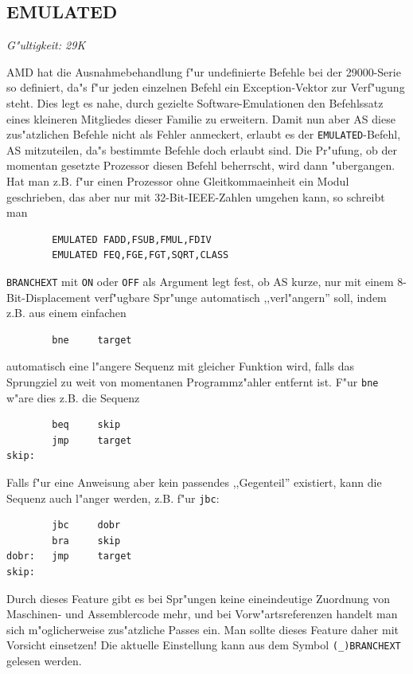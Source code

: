 \documentclass[12pt,a4paper,twoside]{report}
\makeatletter
\newcommand{\tty}[1]{{\tt #1}}
\newcommand{\ttindex}[1]{\index{#1@{\tt #1}}}
\newcommand{\asname}{AS}
\newcommand{\predefsym}[1]{{\tt (\_)#1}}
\makeatother
\begin{document}

\subsection{EMULATED}
\ttindex{EMULATED}

{\em G"ultigkeit: 29K}

AMD hat die Ausnahmebehandlung f"ur undefinierte Befehle bei der
29000-Serie so definiert, da"s f"ur jeden einzelnen Befehl ein
Exception-Vektor zur Verf"ugung steht.  Dies legt es nahe, durch
gezielte Software-Emulationen den Befehlssatz eines kleineren
Mitgliedes dieser Familie zu erweitern.  Damit nun aber \asname{} diese
zus"atzlichen Befehle nicht als Fehler anmeckert, erlaubt es der
\tty{EMULATED}-Befehl, \asname{} mitzuteilen, da"s bestimmte Befehle doch
erlaubt sind.  Die Pr"ufung, ob der momentan gesetzte Prozessor
diesen Befehl beherrscht, wird dann "ubergangen.  Hat man z.B. f"ur
einen Prozessor ohne Gleitkommaeinheit ein Modul geschrieben, das
aber nur mit 32-Bit-IEEE-Zahlen umgehen kann, so schreibt man
\begin{verbatim}
        EMULATED FADD,FSUB,FMUL,FDIV
        EMULATED FEQ,FGE,FGT,SQRT,CLASS
\end{verbatim}

{\tt BRANCHEXT} mit \tty{ON} oder \tty{OFF} als Argument legt fest, ob \asname{}
kurze, nur mit einem 8-Bit-Displacement verf"ugbare Spr"unge automatisch
,,verl"angern'' soll, indem z.B. aus einem einfachen
\begin{verbatim}
        bne     target
\end{verbatim}
automatisch eine l"angere Sequenz mit gleicher Funktion wird, falls das
Sprungziel zu weit von momentanen Programmz"ahler entfernt ist.  F"ur
{\tt bne} w"are dies z.B. die Sequenz
\begin{verbatim}
        beq     skip
        jmp     target
skip:
\end{verbatim}
Falls f"ur eine Anweisung aber kein passendes ,,Gegenteil'' existiert,
kann die Sequenz auch l"anger werden, z.B. f"ur {\tt jbc}:
\begin{verbatim}
        jbc     dobr
        bra     skip
dobr:   jmp     target
skip:
\end{verbatim}
Durch dieses Feature gibt es bei Spr"ungen keine eineindeutige Zuordnung
von Maschinen- und Assemblercode mehr, und bei Vorw"artsreferenzen handelt
man sich m"oglicherweise zus"atzliche Passes ein.  Man sollte dieses
Feature daher mit Vorsicht einsetzen!  Die aktuelle Einstellung kann
aus dem Symbol \predefsym{BRANCHEXT} gelesen werden.
\end{document}
